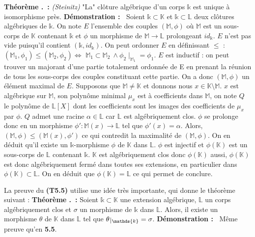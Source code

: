 \documentclass[5pt,a4paper]{article}
\newcounter{thm}[section]
\renewcommand{\thethm}{\thesection.\arabic{thm}}
\newcommand{\thm}[1]{\stepcounter{thm}\noindent\textbf{Théorème \thethm ~:} #1 \newline}
\newcommand{\demo}[1]{\textbf{Démonstration :~} #1 \newline}
\def\restriction#1#2{\mathchoice
              {\setbox1\hbox{${\displaystyle #1}_{\scriptstyle #2}$}
              \restrictionaux{#1}{#2}}
              {\setbox1\hbox{${\textstyle #1}_{\scriptstyle #2}$}
              \restrictionaux{#1}{#2}}
              {\setbox1\hbox{${\scriptstyle #1}_{\scriptscriptstyle #2}$}
              \restrictionaux{#1}{#2}}
              {\setbox1\hbox{${\scriptscriptstyle #1}_{\scriptscriptstyle #2}$}
              \restrictionaux{#1}{#2}}}
\def\restrictionaux#1#2{{#1\,\smash{\vrule height .8\ht1 depth .85\dp1}}_{\,#2}}
\begin{document}
\begin{onehalfspacing}
\thm{\textit{(Steinitz)} "La" clôture algébrique d'un corps $\mathds{k}$ est unique à isomorphisme près.}
\demo{Soient $\mathds{k} \subset \mathbb{K}$ et $\mathds{k} \subset \mathbb{L}$ deux clôtures algébriques de $\mathds{k}$. On note $E$ l'ensemble des couples $(\mathbb{M}, \phi)$ où $\mathbb{M}$ est un sous-corps de $\mathbb{K}$ contenant $\mathds{k}$ et $\phi$ un morphisme de $\mathbb{M} \rightarrow \mathds{L}$ prolongeant $id_\mathds{k}$. $E$ n'est pas vide puisqu'il contient $(\mathds{k}, id_{\mathds{k}})$. On peut ordonner $E$ en définissant $\leq$ : $(\mathbb{M}_1, \phi_1) \leq (\mathbb{M}_2, \phi_2)\Leftrightarrow$ $\mathbb{M}_1 \subset \mathbb{M}_2 ~\wedge \phi_2\mid_{\mathds{M}_1} = \phi_1$. $E$ est inductif : on peut trouver un majorant d'une partie totalement ordonnée de E en prenant la réunion de tous les sous-corps des couples constituant cette partie. On a donc $(\mathbb{M}, \phi)$ un élément maximal de $E$. Supposons que $\mathbb{M} \neq \mathbb{K}$ et donnons nous $x \in \mathbb{K} \setminus \mathbb{M}$. $x$ est algébrique sur $\mathbb{M}$, son polynôme minimal $\mu_x$  est à coefficients dans $\mathbb{M}$, on note $Q$ le polynôme de $\mathbb{L}[X]$ dont les coefficients sont les images des coefficients de $\mu_x$ par $\phi$. $Q$ admet une racine $\alpha \in \mathbb{L}$ car $\mathbb{L}$ est algébriquement clos. $\phi$ se prolonge donc en un morphisme $\phi' : \mathbb{M}(x) \rightarrow \mathbb{L}$ tel que $\phi'(x) = \alpha$. Alors, $(\mathbb{M}, \phi) \leq ( \mathbb{M}(x), \phi')$ ce qui contredit la maximalité de $(\mathbb{M}, \phi)$. On en déduit qu'il existe un $\mathds{k}$-morphisme $\phi$ de $\mathbb{K}$ dans $\mathbb{L}$. $\phi$ est injectif et $\phi(\mathbb{K})$ est un sous-corps de $\mathbb{L}$ contenant $\mathds{k}$. $\mathbb{K}$ est algébriquement clos donc $\phi(\mathbb{K})$ aussi, $\phi(\mathbb{K})$ est donc algébriquement fermé dans toutes ses extensions, en particulier dans $\phi(\mathbb{K}) \subset \mathbb{L}$. On en déduit que $\phi(\mathbb{K}) = \mathbb{L}$ ce qui permet de conclure.}


La preuve du \textbf{(T5.5)} utilise une idée très importante, qui donne le théorème suivant : \newline
\thm{Soient $\mathds{k} \subset \mathbb{K}$ une extension algébrique, $\mathbb{L}$ un corps algébriquement clos et $\sigma$ un morphisme de $\mathds{k}$ dans $\mathbb{L}$. Alors, il existe un morphisme $\theta$ de $\mathbb{K}$ dans $\mathbb{L}$ tel que $\restriction{\theta}{\mathds{k}} = \sigma$.}
\demo{Même preuve qu'en \textbf{5.5}.}



\end{onehalfspacing}
\end{document}
